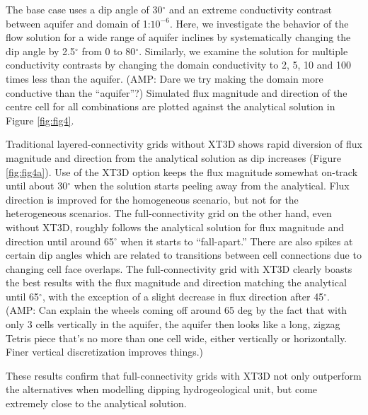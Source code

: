 \documentclass{article}
\begin{document}
The base case uses a dip angle of 30$^{\circ}$ and an extreme conductivity contrast between aquifer and domain of 1:$10^{-6}$. Here, we investigate the behavior of the flow solution for a wide range of aquifer inclines by systematically changing the dip angle by 2.5$^{\circ}$ from 0 to 80$^{\circ}$. Similarly, we examine the solution for multiple conductivity contrasts by changing the domain conductivity to 2, 5, 10 and 100 times less than the aquifer. {\color{red} (AMP: Dare we try making the domain more conductive than the ``aquifer''?)}  Simulated flux magnitude and direction of the centre cell for all combinations are plotted against the analytical solution in Figure \ref{fig:fig4}. 

Traditional layered-connectivity grids without XT3D shows rapid diversion of flux magnitude and direction from the analytical solution as dip increases (Figure \ref{fig:fig4a}). Use of the XT3D option keeps the flux magnitude somewhat on-track until about 30$^{\circ}$ when the solution starts peeling away from the analytical. Flux direction is improved for the homogeneous scenario, but not for the heterogeneous scenarios. The full-connectivity grid on the other hand, even without XT3D, roughly follows the analytical solution for flux magnitude and direction until around 65$^{\circ}$ when it starts to ``fall-apart.'' There are also spikes at certain dip angles which are related to transitions between cell connections due to changing cell face overlaps. The full-connectivity grid with XT3D clearly boasts the best results with the flux magnitude and direction matching the analytical until 65$^{\circ}$, with the exception of a slight decrease in flux direction after 45$^{\circ}$. {\color{red} (AMP: Can explain the wheels coming off around 65 deg by the fact that with only 3 cells vertically in the aquifer, the aquifer then looks like a long, zigzag Tetris piece that's no more than one cell wide, either vertically or horizontally.  Finer vertical discretization improves things.)}

These results confirm that full-connectivity grids with XT3D not only outperform the alternatives when modelling dipping hydrogeological unit, but come extremely close to the analytical solution.
\end{document}
